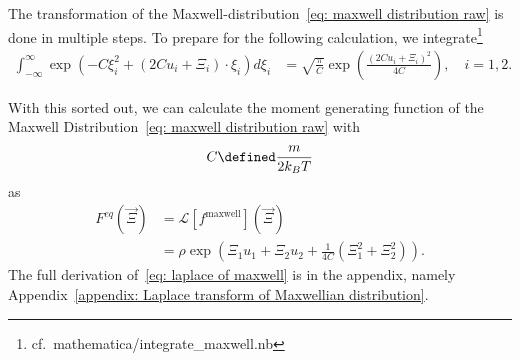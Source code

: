 The transformation of the Maxwell-distribution~\eqref{eq: maxwell distribution raw} is done in multiple steps.
To prepare for the following calculation, we integrate\footnote{cf.\ mathematica/integrate\_maxwell.nb}
\begin{equation}
  \label{eq:integrate exponential sage}
  \begin{aligned}
    \int_{-\infty}^{\infty} \exp \left(-C \xi_i^2 + (2Cu_i + \Xi_i)\cdot\xi_i \right) d\xi_i
    & = \sqrt{\frac{\pi}{C}}\exp \left( \frac{{(2Cu_i + \Xi_i)}^2}{4C}\right),\quad i=1,2
    .
  \end{aligned}
\end{equation}

With this sorted out, we can calculate the moment generating function of the Maxwell Distribution~\eqref{eq: maxwell distribution raw} with
\begin{equation}
  C \defined \frac{m}{2 k_B T}
\end{equation}
as
\begin{equation}
  \label{eq: laplace of maxwell}
  \begin{aligned}
    F^{eq}(\vec{\Xi}) & = \mathcal{L}[f^{\text{maxwell}}](\vec{\Xi})
    \\& = \rho
      \exp \left( \Xi_1 u_1 + \Xi_2 u_2 + \frac{1}{4C}\left(\Xi_1^2 + \Xi_2^2 \right)\right).
  \end{aligned}
\end{equation}
The full derivation of~\eqref{eq: laplace of maxwell} is in the appendix, namely Appendix~\ref{appendix: Laplace transform of Maxwellian distribution}.
